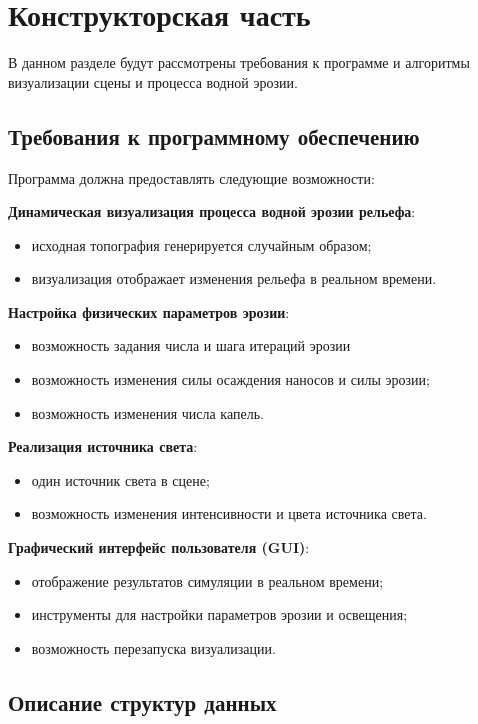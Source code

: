 \chapter{Конструкторская часть}

В данном разделе будут рассмотрены требования к программе и алгоритмы визуализации сцены и процесса водной эрозии.

\section{Требования к программному обеспечению}

Программа должна предоставлять следующие возможности:

\textbf{Динамическая визуализация процесса водной эрозии рельефа}:
\begin{itemize}
    \item исходная топография генерируется случайным образом;
    \item визуализация отображает изменения рельефа в реальном времени.
\end{itemize}

\textbf{Настройка физических параметров эрозии}:
\begin{itemize}
    \item возможность задания числа и шага итераций эрозии
    \item возможность изменения силы осаждения наносов и силы эрозии;
    \item возможность изменения числа капель.
\end{itemize}

\textbf{Реализация источника света}:
\begin{itemize}
    \item один источник света в сцене;
    \item возможность изменения интенсивности и цвета источника света.
\end{itemize}

\textbf{Графический интерфейс пользователя (GUI)}:
\begin{itemize}
    \item отображение результатов симуляции в реальном времени;
    \item инструменты для настройки параметров эрозии и освещения;
    \item возможность перезапуска визуализации.
\end{itemize}

\section{Описание структур данных}

